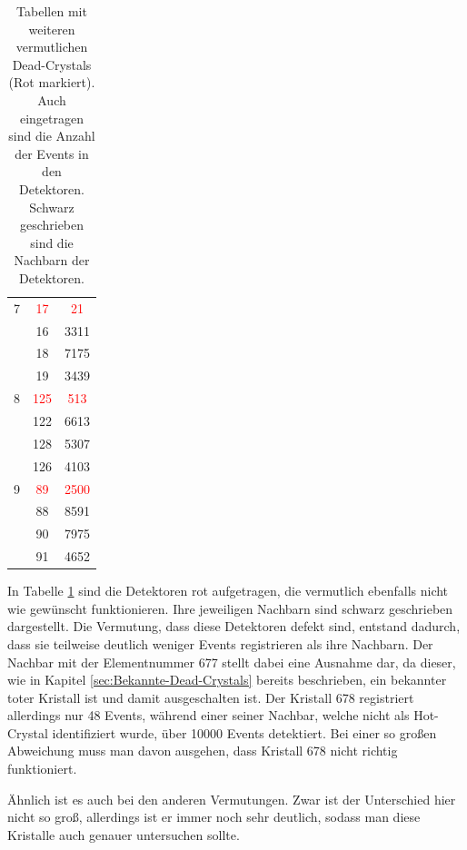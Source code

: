 \documentclass[a4paper,11pt,oneside,final,german,openbib,pdftex]{scrbook}
\begin{document}
{\begin{table}[h!]
\begin{center}
\begin{tabular}{|l|c|c|}
 	\hline
 	\hline
 	7& \textcolor{red}{17} &\textcolor{red}{21} \\
 	\cline{2-3}
 	& 16 & 3311\\
 	\cline{2-3}
 	& 18& 7175 \\
 	\cline{2-3}
 	 & 19& 3439 \\
 	\hline
 	\hline
 	
 	8 & \textcolor{red}{125} &\textcolor{red}{513} \\
 	\cline{2-3}
 	
 	 & 122& 6613\\
 	\cline{2-3}
 	 & 128 & 5307 \\
 	\cline{2-3}
 	& 126 & 4103 \\
 	\hline
 	\hline
 	
 	9 & \textcolor{red}{89}& \textcolor{red}{2500}\\
 	\cline{2-3}
 	& 88& 8591\\
 	\cline{2-3}
 	&90&7975 \\
 	\cline{2-3}
 	&91&4652 \\
 	\hline
 	
 	
 	\end{tabular}
 \caption[Vermutete Dead-Crystals und ihre Nachbarn mit Anzahl ihrer Events]{Tabellen mit weiteren vermutlichen Dead-Crystals (Rot markiert). Auch eingetragen sind die Anzahl der Events in den Detektoren. Schwarz geschrieben sind die Nachbarn der Detektoren.}
\label{tab:Vermutete-Dead-Crystals} 
\end{center}
 \end{table}
 
 In Tabelle \ref{tab:Vermutete-Dead-Crystals} sind die Detektoren rot aufgetragen, die vermutlich ebenfalls nicht wie gew\"unscht funktionieren. Ihre jeweiligen Nachbarn sind schwarz geschrieben dargestellt. Die Vermutung, dass diese Detektoren defekt sind, entstand dadurch, dass sie teilweise deutlich weniger Events registrieren als ihre Nachbarn. Der Nachbar mit der Elementnummer 677 stellt dabei eine Ausnahme dar, da dieser, wie in Kapitel \ref{sec:Bekannte-Dead-Crystals} bereits beschrieben, ein bekannter toter Kristall ist und damit ausgeschalten ist. Der Kristall 678 registriert allerdings nur 48 Events, w\"ahrend einer seiner Nachbar, welche nicht als Hot-Crystal identifiziert wurde, \"uber 10000 Events detektiert. Bei einer so gro{\ss}en Abweichung muss man davon ausgehen, dass Kristall 678 nicht richtig funktioniert.  
 
 \"Ahnlich ist es auch bei den anderen Vermutungen. Zwar ist der Unterschied hier nicht so gro{\ss}, allerdings ist er immer noch sehr deutlich, sodass man diese Kristalle auch genauer untersuchen sollte.
 \newpage

}
\end{document}
